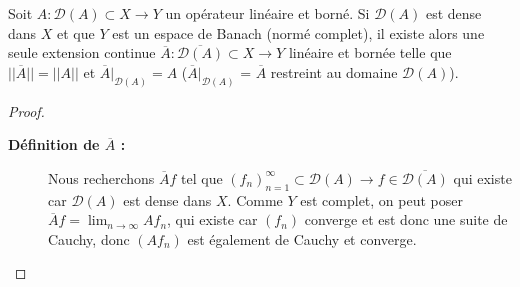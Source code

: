 \begin{theo}
    Soit $A:\mathcal{D}(A)\subset X\to Y$ un opérateur linéaire et borné. Si $\mathcal{D}(A)$ est dense dans $X$ et que $Y$ est un espace de Banach (normé complet), il existe alors une seule extension continue $\overline{A}:\overline{\mathcal{D}(A)} \subset X \rightarrow Y$ linéaire et bornée telle que $||\overline{A}|| = ||A||$ et $\overline{A}\big|_{\mathcal{D}(A)} = A$ ($\overline{A}\big|_{\mathcal{D}(A)}$ = $\overline{A}$ restreint au domaine $\mathcal{D}(A)$).
\end{theo}
\begin{proof}
    \begin{description}
        \item[\textbf{Définition de $\overline{A}$ :}] Nous recherchons $\overline{A}f$ tel que $(f_n)_{n=1}^\infty\subset\mathcal{D}(A) \to f \in \overline{\mathcal{D}(A)}$ qui existe car $\mathcal{D}(A)$ est dense dans $X$. Comme $Y$ est complet, on peut poser $\overline{A}f = \lim_{n\to\infty}Af_n$, qui existe car $(f_n)$ converge et est donc une suite de Cauchy, donc $(Af_n)$ est également de Cauchy et converge.
        

\end{description}
\end{proof}
